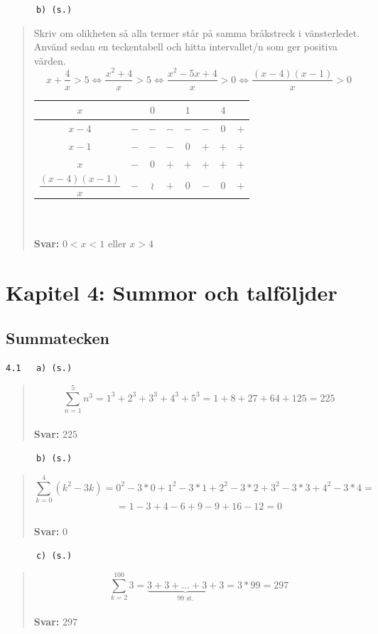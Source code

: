 \documentclass[a4paper]{article}
\newcommand{\tskcol}[1]{\textcolor{tskcol}{#1}}
\begin{document}
	\texttt{\tskcol{~~~~~~b) (s.)}}
	\begin{quotation}
		\noindent
		Skriv om olikheten så alla termer står på samma bråkstreck i vänsterledet. Använd sedan en teckentabell och hitta intervallet/n som ger positiva värden.
		\[x+\dfrac{4}{x}>5 \Leftrightarrow
		\dfrac{x^2+4}{x}>5 \Leftrightarrow
		\dfrac{x^2-5x+4}{x}>0 \Leftrightarrow
		\dfrac{(x-4)(x-1)}{x}>0\]
		\begin{tabular}{c|c|c|c|c|c|c|c}
			$x$                      &     & $0$ &     & $1$ &     & $4$ &     \\ \hline
			$x-4$                    & $-$ & $-$ & $-$ & $-$ & $-$ & $0$ & $+$ \\
			$x-1$                    & $-$ & $-$ & $-$ & $0$ & $+$ & $+$ & $+$ \\
			$x$                      & $-$ & $0$ & $+$ & $+$ & $+$ & $+$ & $+$ \\ \hline
			$\dfrac{(x-4)(x-1)}{x}$  & $-$ &$\wr$& $+$ & $0$ & $-$ & $0$ & $+$ \\
		\end{tabular}
		\\ \\
		\textbf{Svar:} $0<x<1$ eller $x>4$
	\end{quotation}
	
	\pagebreak
	\section*{Kapitel 4: Summor och talföljder}
	\subsection*{Summatecken}
	
	\texttt{\tskcol{4.1~~~a) (s.)}}
	\begin{quotation}
		\noindent
		\[\sum_{n=1}^{5}n^3=1^3+2^3+3^3+4^3+5^3=
		1+8+27+64+125=
		225\]
		\\
		\textbf{Svar:} $225$
	\end{quotation}
	
	\texttt{\tskcol{~~~~~~b) (s.)}}
	\begin{quotation}
		\noindent
		\[\sum_{k=0}^{4}(k^2-3k)=
		0^2-3*0+1^2-3*1+2^2-3*2+3^2-3*3+4^2-3*4=\]
		\[=1-3+4-6+9-9+16-12=0\]
		\\
		\textbf{Svar:} $0$
	\end{quotation}
	
	\texttt{\tskcol{~~~~~~c) (s.)}}
	\begin{quotation}
		\noindent
		\[\sum_{k=2}^{100}3=\underbrace{3+3+\ldots+3+3}_\text{99 st.}=
		3*99=
		297\]
		\\
		\textbf{Svar:} $297$
	\end{quotation}
	
\end{document}
